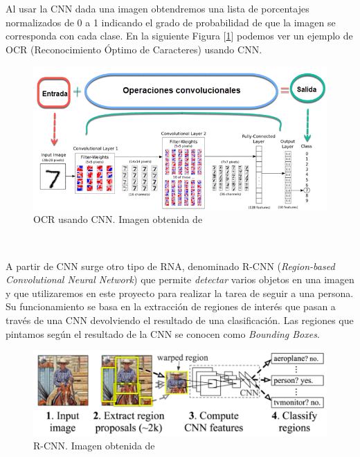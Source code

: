 Al usar la CNN dada una imagen obtendremos una lista de porcentajes normalizados de 0 a 1 indicando el grado de probabilidad de que la imagen se corresponda con cada clase. En la siguiente Figura [\ref{fig:ocr_cnn}] podemos ver un ejemplo de OCR (Reconocimiento Óptimo de Caracteres) usando CNN.\\

\begin{figure}[H]
  \begin{center}
    \includegraphics[width=15cm]{imagenes/cap1/ocr-cnn.png}
  \end{center}
  \caption[OCR usando CNN)]{OCR usando CNN. Imagen obtenida de \cite{dnn}}
  \label{fig:ocr_cnn}
\end{figure}\

A partir de CNN surge otro tipo de RNA, denominado R-CNN (\textit{Region-based Convolutional Neural Network}) que permite \textit{detectar} varios objetos en una imagen y que utilizaremos en este proyecto para realizar la tarea de seguir a una persona. Su funcionamiento se basa en la extracción de regiones de interés que pasan a través de una CNN devolviendo el resultado de una clasificación. Las regiones que pintamos según el resultado de la CNN se conocen como \textit{Bounding Boxes}.

\begin{figure}[H]
  \begin{center}
    \includegraphics[width=15cm]{imagenes/cap1/r-cnn.png}
  \end{center}
  \caption[Ejemplo de R-CNN]{R-CNN. Imagen obtenida de \cite{r-cnn}}
  \label{fig:r-cnn}
\end{figure}\

